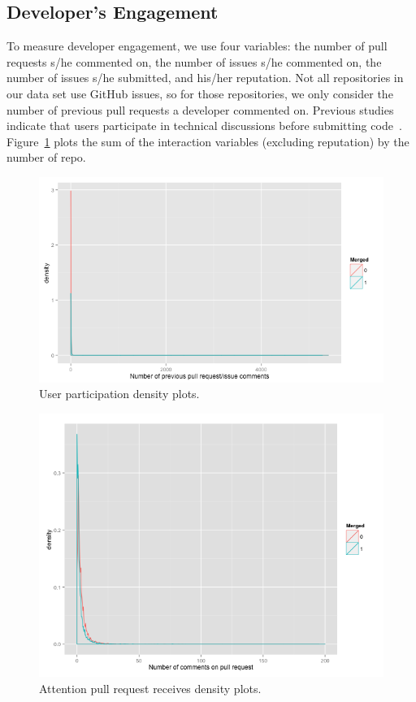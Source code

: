 \documentclass{sigchi}
\begin{document}
\subsection{Developer's Engagement} To measure developer engagement, we use four
variables: the number of pull requests s/he commented on, the number of issues
s/he commented on, the number of issues s/he submitted, and his/her reputation.
Not all repositories in our data set use GitHub issues, so for those
repositories, we only consider the number of previous pull requests a developer
commented on. Previous studies indicate that users participate in technical
discussions before submitting code~\cite{von_krogh_community_2003}.
Figure~\ref{fig:up} plots the sum of the interaction variables (excluding
reputation) by the number of repo.

\begin{figure}[p] \centering
\includegraphics[scale=0.6]{figures/number_comments_density_ggplot.png}
\caption{User participation density plots.} \label{fig:up} \end{figure}

\begin{figure}[p] \centering
\includegraphics[scale=0.6]{figures/comments_on_pr_density_ggplot.png}
\caption{Attention pull request receives density plots.} \label{fig:aprr}
\end{figure}
\end{document}
